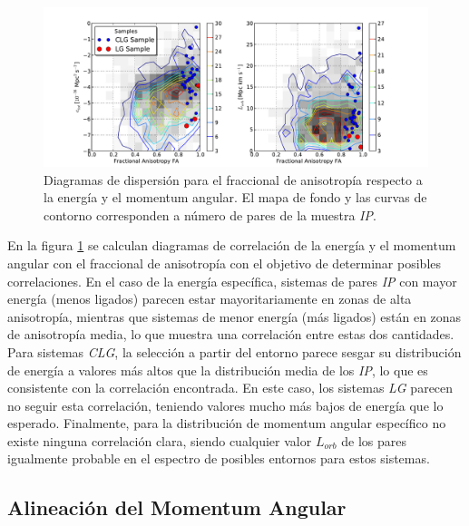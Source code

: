 \
\begin{figure}[htbp]
	\centering
	\includegraphics[trim = 20mm 0mm 35mm 10mm, clip, width=1.0\textwidth]
	{./figures/4_results/CLG_FA_E-L.pdf}
	
	\caption{\small{Diagramas de dispersión para el fraccional de 
	anisotropía respecto a la energía y el momentum angular. El mapa de 
	fondo y las curvas de contorno corresponden a número de pares de 
	la muestra 	\textit{IP}.}}
	\label{fig:CLG_FA_E-L}
\end{figure}


En la figura \ref{fig:CLG_FA_E-L} se calculan diagramas de correlación de
la energía y el momentum angular con el fraccional de anisotropía con el 
objetivo de determinar posibles correlaciones. En el caso de la energía
específica, sistemas de pares \textit{IP} con mayor energía (menos ligados) 
parecen estar mayoritariamente en zonas de alta anisotropía, mientras que
sistemas de menor energía (más ligados) están en zonas de anisotropía media,
lo que muestra una correlación entre estas dos cantidades. Para sistemas
\textit{CLG}, la selección a partir del entorno parece sesgar su 
distribución de energía a valores más altos que la distribución media de los
\textit{IP}, lo que es consistente con la correlación encontrada. En este
caso, los sistemas \textit{LG} parecen no seguir esta correlación, teniendo
valores mucho más bajos de energía que lo esperado. Finalmente, para la 
distribución de momentum angular específico no existe ninguna correlación 
clara, siendo cualquier valor $L_{orb}$ de los pares igualmente probable 
en el espectro de posibles entornos para estos sistemas.


	
	\subsection{Alineación del Momentum Angular}
	\label{subsec:AngularMomentumAlineation}
	
